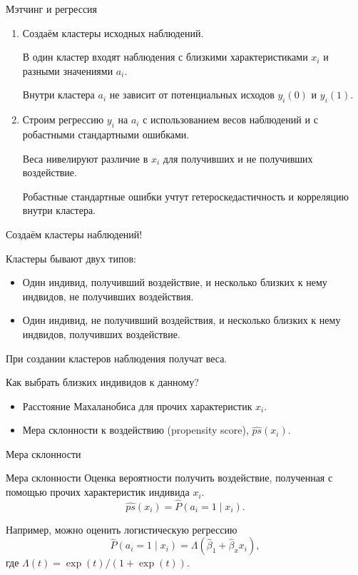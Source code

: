 \begin{frame}{Мэтчинг и регрессия}

  \begin{enumerate}[<+->]
    \item Создаём кластеры исходных наблюдений. 
    
    В один кластер входят наблюдения с \alert{близкими} характеристиками $x_i$
    и разными значениями $a_i$.

    Внутри кластера $a_i$ не зависит от потенциальных исходов $y_i(0)$ и $y_i(1)$.

    \item Строим регрессию $y_i$ на $a_i$ с использованием \alert{весов} наблюдений 
    и с \alert{робастными стандартными ошибками}.

    Веса нивелируют различие в $x_i$ для получивших и не получивших воздействие. 

    Робастные стандартные ошибки учтут гетероскедастичность и 
    корреляцию внутри кластера. 
  \end{enumerate}




\end{frame}


\begin{frame}{Создаём кластеры наблюдений!}

  Кластеры бывают двух типов:
  \begin{itemize}
    \item Один индивид, получивший воздействие, и несколько \alert{близких к нему} индвидов, не получивших воздействия.  \pause
    \item Один индивид, не получивший воздействия, и несколько \alert{близких к нему} индвидов, получивших воздействие. 
  \end{itemize}
  \pause
  При создании кластеров наблюдения получат веса.

  \pause
  Как выбрать близких индивидов к данному?
  \begin{itemize}
    \item \alert{Расстояние Махаланобиса} для прочих характеристик $x_i$. \pause
    \item \alert{Мера склонности} к воздействию (propensity score), $\widehat{ps}(x_i)$.
  \end{itemize}

\end{frame}

\begin{frame}{Мера склонности}

\begin{block}{Мера склонности}
Оценка вероятности получить воздействие, полученная с помощью прочих характеристик индивида $x_i$.
\[
\widehat{ps}(x_i) = \hat P(a_i = 1 \mid x_i).
\]
\end{block}
\pause
Например, можно оценить \alert{логистическую регрессию}
\[
  \hat P(a_i = 1 \mid x_i) = \Lambda(\hat\beta_1 + \hat\beta_x x_i),
\]
где $\Lambda(t) = \exp(t)/ (1 + \exp (t))$.

\end{frame}


